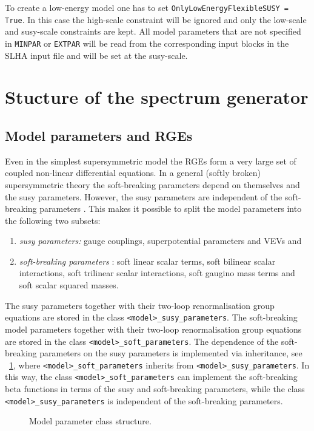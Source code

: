 \documentclass[final,3p,times,pdflatex]{elsarticle}
\newcommand{\code}[1]{\lstinline|#1|}  %
\begin{document}
To create a low-energy model one has to set
\code{OnlyLowEnergyFlexibleSUSY = True}.  In this case the high-scale
constraint will be ignored and only the low-scale and susy-scale
constraints are kept.  All model parameters that are not specified in
\code{MINPAR} or \code{EXTPAR} will be read from the corresponding
input blocks in the SLHA input file and will be set at the susy-scale.

\section{Stucture of the spectrum generator}
\label{Sec:SpecGenStruct}
\subsection{Model parameters and RGEs}
Even in the simplest supersymmetric model the RGEs form a very large
set of coupled non-linear differential equations.  In a general
(softly broken) supersymmetric theory the soft-breaking parameters
depend on themselves and the susy parameters.  However, the susy
parameters are independent of the soft-breaking parameters
\cite{Jones:1974pg,Jones:1983vk,West:1984dg,Martin:1993yx,Yamada:1993ga,MV94,Fonseca:2011vn,Sperling:2013eva,Sperling:2013xqa}.
This makes it possible to split the model parameters into the
following two subsets:
%
\begin{enumerate}
\item \emph{susy parameters:} gauge couplings, superpotential
  parameters and VEVs and
\item \emph{soft-breaking parameters} \cite{Girardello:1981wz}: soft
  linear scalar terms, soft bilinear scalar interactions, soft
  trilinear scalar interactions, soft gaugino mass terms and soft
  scalar squared masses.
\end{enumerate}
%
The susy parameters together with their two-loop renormalisation group
equations are stored in the class \code{<model>_susy_parameters}.  The
soft-breaking model parameters together with their two-loop
renormalisation group equations are stored in the class
\code{<model>_soft_parameters}.  The dependence of the soft-breaking
parameters on the susy parameters is implemented via inheritance, see
\figurename~\ref{fig:parameter-classes}, where
\code{<model>_soft_parameters} inherits from
\code{<model>_susy_parameters}.  In this way, the class
\code{<model>_soft_parameters} can implement the soft-breaking beta
functions in terms of the susy and soft-breaking parameters, while the
class \code{<model>_susy_parameters} is independent of the
soft-breaking parameters.
%
\begin{figure}
  \centering
  \caption{Model parameter class structure.}
  \label{fig:parameter-classes}
\end{figure}
\end{document}
